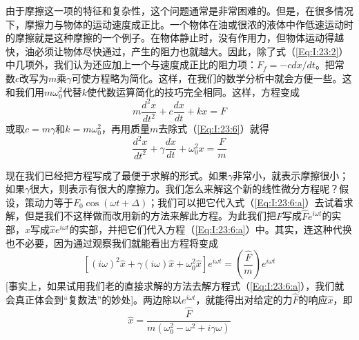 由于摩擦这一项的特征和复杂性，这个问题通常是非常困难的。但是，在很多情况下，摩擦力与物体的运动速度成正比。一个物体在油或很浓的液体中作低速运动时的摩擦就是这种摩擦的一个例子。在物体静止时，没有作用力，但物体运动得越快，油必须让物体尽快通过，产生的阻力也就越大。因此，除了式（\ref{Eq:I:23:2}）中几项外，我们认为还应加上一个与速度成正比的阻力项：$F_f=-cdx/dt$。把常数$c$改写为$m$乘$\gamma$可使方程略为简化。这样，在我们的数学分析中就会方便一些。这和我们用$m\omega_0^2$代替$k$使代数运算简化的技巧完全相同。这样，方程变成
\begin{equation}
    \label{Eq:I:23:6}
    m\frac{d^2x}{dt^2} + c\frac{dx}{dt} + kx = F
\end{equation}
或取$c=m\gamma$和$k=m\omega_0^2$，再用质量$m$去除式（\ref{Eq:I:23:6}）就得
\begin{equation*}
    \label{Eq:I:23:6:a}
    \frac{d^2x}{dt^2} + \gamma\frac{dx}{dt} + \omega_0^2x = \frac{F}{m} \tag{23.6a}
\end{equation*}

现在我们已经把方程写成了最便于求解的形式。如果$\gamma$非常小，就表示摩擦很小；如果$\gamma$很大，则表示有很大的摩擦力。我们怎么来解这个新的线性微分方程呢？假设，策动力等于$F_0\cos(\omega t+\Delta)$；我们可以把它代入式（\ref{Eq:I:23:6:a}）去试着求解，但是我们不这样做而改用新的方法来解此方程。为此我们把$F$写成$\hat{F}e^{i\omega t}$的实部，$x$写成$\hat{x}e^{i\omega t}$的实部，并把它们代入方程（\ref{Eq:I:23:6:a}）中。其实，连这种代换也不必要，因为通过观察我们就能看出方程将变成
\begin{equation}
    \label{Eq:I:23:7}
    [(i\omega)^2\hat{x} + \gamma(i\omega)\hat{x} + \omega_0^2\hat{x}]e^{i\omega t} = \left (\frac{\hat{F}}{m} \right ) e^{i\omega t}
\end{equation}
[事实上，如果试用我们老的直接求解的方法去解方程式（\ref{Eq:I:23:6:a}），我们就会真正体会到“复数法”的妙处]。两边除以$e^{i\omega t}$，就能得出对给定的力$\hat{F}$的响应$\hat{x}$，即
\begin{equation}
    \label{Eq:I:23:8}
    \hat{x} = \frac{\hat{F}}{m(\omega_0^2 - \omega^2 + i\gamma\omega)}
\end{equation}


